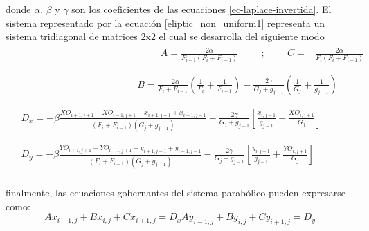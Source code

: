 \documentclass[letterpaper, openright, 12pt]{book}
\begin{document}
        donde $\alpha$, $\beta$ y $\gamma$ son los coeficientes de las
        ecuaciones \ref{ec-laplace-invertida}. El sistema representado por la
        ecuación \ref{eliptic_non_uniform1} representa un sistema tridiagonal de
        matrices $2$x$2$ el cual se desarrolla del siguiente modo\\
        \begin{align*}
            &\begin{aligned}
                &&&&&&&&&&&&&&&&&&A = \frac{2\alpha}{F_{i - 1} (F_i + F_{i - 1}) } &&& ; &&& C =& \frac{2\alpha}{F_i (F_i + F_{i - 1}) }
            \end{aligned}\\ \\
            &\begin{aligned}
                &&&&&&&&&&&&&&&B = \frac{-2 \alpha}{F_i + F_{i - 1}} \left( \frac{1}{F_i} + \frac{1}{F_{i - 1}} \right) - \frac{2\gamma}{G_j + g_{j - 1}} \left( \frac{1}{G_j}  + \frac{1}{g_{j - 1}} \right)
            \end{aligned}\\ \\
            &\begin{aligned}
                D_x = -\beta \frac{ XO_{i+1, j+1} - XO_{i-1, j+1} - x_{i+1, j-1} + x_{i-1, j-1} }{ (F_i + F_{i - 1}) (G_j + g_{j - 1}) } - \frac{2 \gamma}{G_j + g_{j - 1}} \left[ \frac{x_{i, j - 1}}{g_{j-1}} + \frac{XO_{i, j + 1}}{G_j} \right]
            \end{aligned} \\ \\
            &\begin{aligned}
                D_y = -\beta \frac{ YO_{i+1, j+1} - YO_{i-1, j+1} - y_{i+1, j-1} + y_{i-1, j-1} }{ (F_i + F_{i - 1}) (G_j + g_{j - 1}) } - \frac{2 \gamma}{G_j + g_{j - 1}} \left[ \frac{y_{i, j - 1}}{g_{j-1}} + \frac{YO_{i, j + 1}}{G_j} \right]
            \end{aligned}
        \end{align*}\\
        finalmente, las ecuaciones gobernantes del sistema parabólico pueden
        expresarse como:\\
        \begin{subequations}
            \begin{equation}
                Ax_{i-1, j} + B x_{i, j} + Cx_{i+1, j} = D_x
            \end{equation}
            \begin{equation}
                Ay_{i-1, j} + B y_{i, j} + Cy_{i+1, j} = D_y
            \end{equation}
            \label{parabolic_final}
        \end{subequations}
\end{document}
